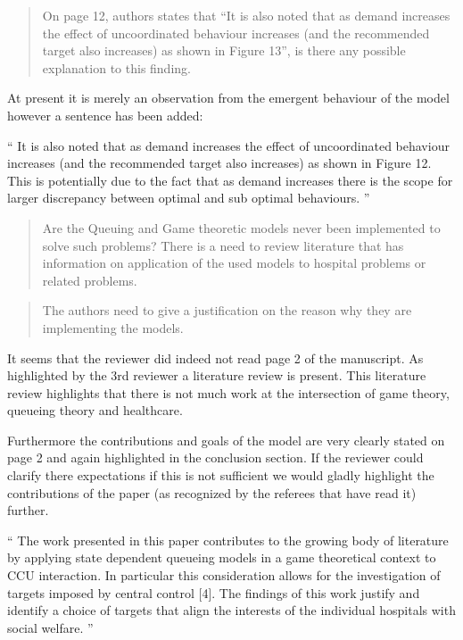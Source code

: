 \documentclass{article}
\begin{document}
\begin{quote}
    \begin{textit}{
    On page 12, authors states that ``It is also noted that as demand increases the effect of uncoordinated behaviour increases (and the recommended target also increases) as shown in Figure 13'', is there any possible explanation to this finding.
    }\end{textit}
\end{quote}

At present it is merely an observation from the emergent behaviour of the model however a sentence has been added:

``
It is also noted that as demand increases the effect of uncoordinated behaviour increases (and the recommended target also increases) as shown in Figure 12. This is potentially due to the fact that as demand increases there is the scope for larger discrepancy between optimal and sub optimal behaviours.
''

\begin{quote}
    \begin{textit}{
    Are the Queuing and Game theoretic models never been implemented to solve such problems? There is a need to review literature that has information on application of the used models to hospital problems or related problems.
    }\end{textit}
\end{quote}

\begin{quote}
    \begin{textit}{
The authors need to give a justification on the reason why they are implementing the models.
    }\end{textit}
\end{quote}

It seems that the reviewer did indeed not read page 2 of the manuscript. As highlighted by the 3rd reviewer a literature review is present. This literature review highlights that there is not much work at the intersection of game theory, queueing theory and healthcare.

Furthermore the contributions and goals of the model are very clearly stated on page 2 and again highlighted in the conclusion section. If the reviewer could clarify there expectations if this is not sufficient we would gladly highlight the contributions of the paper (as recognized by the referees that have read it) further.

``
The work presented in this paper contributes to the growing body of literature by applying state dependent queueing models in a game theoretical context to CCU interaction.
In particular this consideration allows for the investigation of targets imposed by central control [4].
The findings of this work justify and identify a choice of targets that align the interests of the individual hospitals with social welfare.
''
\end{document}
